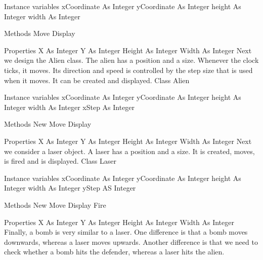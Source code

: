 Instance variables
xCoordinate As Integer
yCoordinate As Integer
height As Integer
width As Integer
 
Methods
Move
Display

Properties
X As Integer
Y As Integer
Height As Integer
Width As Integer
Next we design the Alien class. The alien has a position and a size. Whenever the clock ticks, it moves. Its direction and speed is controlled by the step size that is used when it moves. It can be created and displayed.
Class Alien

Instance variables
xCoordinate As Integer
yCoordinate As Integer
height As Integer
width As Integer
xStep As Integer

Methods
New
Move
Display
 
Properties
X As Integer
Y As Integer
Height As Integer
Width As Integer
Next we consider a laser object. A laser has a position and a size. It is created, moves, is fired and is displayed.
Class Laser

Instance variables
xCoordinate As Integer
yCoordinate As Integer
height As Integer
width As Integer
yStep AS Integer
 
Methods
New
Move
Display
Fire
 
Properties
X As Integer
Y As Integer
Height As Integer
Width As Integer
Finally, a bomb is very similar to a laser. One difference is that a bomb moves downwards, whereas a laser moves upwards. Another difference is that we need to check whether a bomb hits the defender, whereas a laser hits the alien.

